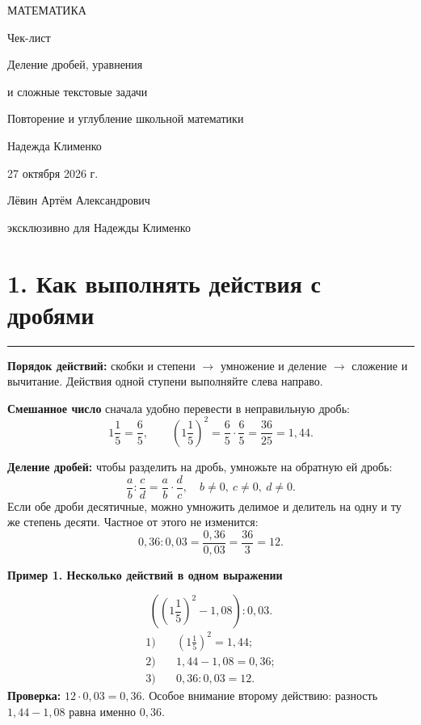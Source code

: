 \documentclass[a4paper,12pt]{article}
\newcommand{\sect}[1]{\section*{#1}\vspace{-3pt}\noindent\textcolor{accent}{\rule{\linewidth}{0.5pt}}\vspace{3pt}}
\newcommand{\key}[1]{\textcolor{darkaccent}{\textbf{#1}}}
\newcommand{\ex}[1]{\medskip\noindent\textcolor{darkaccent}{\textbf{#1}}\par\vspace{-2mm}}
\begin{document}
\thispagestyle{empty}
\begin{center}
\vspace*{28mm}
{\Large\textcolor{darkaccent}{МАТЕМАТИКА}}\par
\vspace{21mm}
{\LARGE Чек-лист}\par
\vspace{15mm}
{\LARGE\textcolor{accent}{Деление дробей, уравнения}}\par
\vspace{2mm}
{\LARGE\textcolor{accent}{и сложные текстовые задачи}}\par
\vspace{12mm}
{\large Повторение и углубление школьной математики}\par
\vfill
{\large Надежда Клименко}\par
\vspace{12mm}
{\large 27 октября 2026 г.}\par
\vspace{18mm}
{\normalsize Лёвин Артём Александрович}\par
{\normalsize эксклюзивно для Надежды Клименко}\par
\vspace{15mm}
\end{center}
\clearpage

\sect{1. Как выполнять действия с дробями}
\key{Порядок действий:} скобки и степени $\rightarrow$ умножение и деление $\rightarrow$ сложение и вычитание. Действия одной ступени выполняйте слева направо.

\key{Смешанное число} сначала удобно перевести в неправильную дробь:
\[
1\frac15=\frac65,\qquad
\left(1\frac15\right)^2=\frac65\cdot\frac65=\frac{36}{25}=1{,}44.
\]

\key{Деление дробей:} чтобы разделить на дробь, умножьте на обратную ей дробь:
\[
\frac ab:\frac cd=\frac ab\cdot\frac dc,
\quad b\ne0,\ c\ne0,\ d\ne0.
\]
Если обе дроби десятичные, можно умножить делимое и делитель на одну и ту же степень десяти. Частное от этого не изменится:
\[
0{,}36:0{,}03=\frac{0{,}36}{0{,}03}
=\frac{36}{3}=12.
\]

\ex{Пример 1. Несколько действий в одном выражении}
\[
\left(\left(1\frac15\right)^2-1{,}08\right):0{,}03.
\]
\[
\begin{aligned}
1)&\quad \left(1\frac15\right)^2=1{,}44;\\
2)&\quad 1{,}44-1{,}08=0{,}36;\\
3)&\quad 0{,}36:0{,}03=12.
\end{aligned}
\]
\key{Проверка:} $12\cdot0{,}03=0{,}36$. Особое внимание второму действию: разность $1{,}44-1{,}08$ равна именно $0{,}36$.
\end{document}
